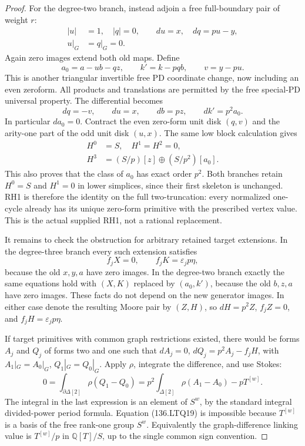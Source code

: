 \begin{proof}
For the degree-two branch, instead adjoin a free full-boundary
pair of weight \(r\):
\[
 \begin{aligned}
 |u|&=1,\quad |q|=0,\qquad du=x,\quad dq=pu-y,\\
 u|_G&=q|_G=0.
 \end{aligned}
                                                        \tag{136.LTQ14}
\]
Again zero images extend both old maps.  Define
\[
 a_0=a-ub-qz,\qquad k'=k-pqb,\qquad v=y-pu.
                                                        \tag{136.LTQ15}
\]
This is another triangular invertible free PD coordinate
change, now including an even zeroform.  All products and
translations are permitted by the free special-PD universal
property.  The differential becomes
\[
                    dq=-v,\qquad du=x,\qquad db=pz,\qquad dk'=p^2a_0.
                                                        \tag{136.LTQ16}
\]
In particular \(da_0=0\).  Contract the even zero-form
unit disk \((q,v)\) and the arity-one part of the odd
unit disk \((u,x)\).  The same low block calculation gives
\[
 \begin{aligned}
 H^0&=S,\quad H^1=H^2=0,\\
 H^3&=(S/p)[z]\oplus(S/p^2)[a_0].
 \end{aligned}
                                                        \tag{136.LTQ17}
\]
This also proves that the class of \(a_0\) has exact
order \(p^2\).  Both branches retain \(H^0=S\) and \(H^1=0\) in
lower simplices, since their first skeleton is unchanged.  RH1 is therefore the identity on
the full two-truncation: every normalized one-cycle already
has its unique zero-form primitive with the prescribed vertex
value.  This is the actual supplied RH1, not a rational
replacement.

It remains to check the obstruction for arbitrary retained
target extensions.  In the degree-three branch every such
extension satisfies
\[
                      f_jX=0,\qquad f_jK=\varepsilon_j p\eta,
                                                        \tag{136.LTQ18}
\]
because the old \(x,y,a\) have zero images.  In the
degree-two branch exactly the same equations hold with
\((X,K)\) replaced by \((a_0,k')\), because the
old \(b,z,a\) have zero images.  These facts do not
depend on the new generator images.  In either case denote
the resulting Moore pair by \((Z,H)\), so
\(dH=p^2 Z\), \(f_j Z=0\), and
\(f_jH=\varepsilon_jp\eta\).

If target primitives with common graph restrictions existed,
there would be forms \(A_j\) and \(Q_j\) of forms two
and one such that
\(dA_j=0\), \(dQ_j=p^2 A_j-f_jH\), with
\(A_1|_G=A_0|_G\), \(Q_1|_G=Q_0|_G\).
Apply \(\rho\), integrate the difference, and use Stokes:
\[
 0=\int_{\partial\Delta[2]}\rho(Q_1-Q_0)
   =p^2\int_{\Delta[2]}\rho(A_1-A_0)-pT^{[w]}.
                                                        \tag{136.LTQ19}
\]
The integral in the last expression is an element of
\(S^w\), by the standard integral divided-power period
formula.  Equation (136.LTQ19) is impossible because
\(T^{[w]}\) is a basis of the free rank-one group
\(S^w\).  Equivalently the graph-difference linking value
is \(T^{[w]}/p\) in \(\mathbb Q[T]/S\), up to the
single common sign convention.


\end{proof}
